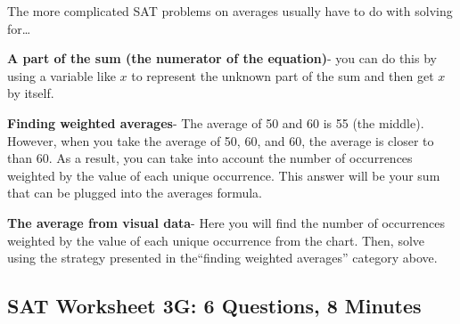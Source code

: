 \begin{multienumerate}
\end{multienumerate}

\hrulefill

The more complicated SAT problems on averages usually have to do with solving for\ldots

\textbf{A part of the sum (the numerator of the equation)}- you can do this by using a variable like $x$ to represent the unknown part of the sum and then get $x$ by itself.

\vfill
\textbf{Finding weighted averages}- The average of 50 and 60 is 55 (the middle). However, when you take the average of 50, 60, and 60, the average is closer to \shortline than 60. As a result, you can take into account the number of occurrences weighted by the value of each unique occurrence. This answer will be your sum that can be plugged into the averages formula. 

\vfill
\textbf{The average from visual data}- Here you will find the number of occurrences weighted by the value of each unique occurrence from the chart. Then, solve using the strategy presented in the``finding weighted averages'' category above. 

\vfill
\newpage
\subsection{SAT Worksheet 3G: 6 Questions, 8 Minutes}


